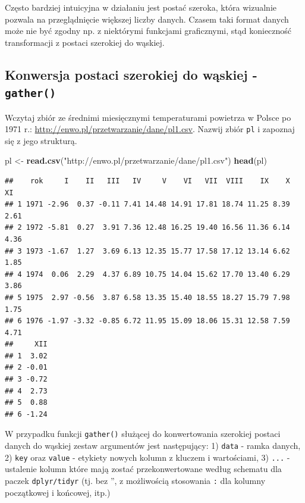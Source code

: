 \documentclass[]{book}
\newenvironment{Shaded}{\begin{snugshade}}{\end{snugshade}}
\newcommand{\KeywordTok}[1]{\textcolor[rgb]{0.13,0.29,0.53}{\textbf{#1}}}
\newcommand{\StringTok}[1]{\textcolor[rgb]{0.31,0.60,0.02}{#1}}
\newcommand{\NormalTok}[1]{#1}
\theoremstyle{definition}
\theoremstyle{definition}
\theoremstyle{definition}
\theoremstyle{remark}
\begin{document}
Często bardziej intuicyjna w działaniu jest postać szeroka, która
wizualnie pozwala na przeglądnięcie większej liczby danych. Czasem taki
format danych może nie być zgodny np. z niektórymi funkcjami
graficznymi, stąd konieczność transformacji z postaci szerokiej do
wąskiej.

\subsection*{\texorpdfstring{Konwersja postaci szerokiej do wąskiej -
\texttt{gather()}}{Konwersja postaci szerokiej do wąskiej - gather()}}\label{konwersja-postaci-szerokiej-do-waskiej---gather}

Wczytaj zbiór ze średnimi miesięcznymi temperaturami powietrza w Polsce
po 1971 r.: \url{http://enwo.pl/przetwarzanie/dane/pl1.csv}. Nazwij
zbiór \texttt{pl} i zapoznaj się z jego strukturą.

\begin{Shaded}
\begin{Highlighting}[]
\NormalTok{pl <-}\StringTok{ }\KeywordTok{read.csv}\NormalTok{(}\StringTok{"http://enwo.pl/przetwarzanie/dane/pl1.csv"}\NormalTok{)}
\KeywordTok{head}\NormalTok{(pl)}
\end{Highlighting}
\end{Shaded}

\begin{verbatim}
##    rok     I    II   III   IV     V    VI   VII  VIII    IX    X   XI
## 1 1971 -2.96  0.37 -0.11 7.41 14.48 14.91 17.81 18.74 11.25 8.39 2.61
## 2 1972 -5.81  0.27  3.91 7.36 12.48 16.25 19.40 16.56 11.36 6.14 4.36
## 3 1973 -1.67  1.27  3.69 6.13 12.35 15.77 17.58 17.12 13.14 6.62 1.85
## 4 1974  0.06  2.29  4.37 6.89 10.75 14.04 15.62 17.70 13.40 6.29 3.86
## 5 1975  2.97 -0.56  3.87 6.58 13.35 15.40 18.55 18.27 15.79 7.98 1.75
## 6 1976 -1.97 -3.32 -0.85 6.72 11.95 15.09 18.06 15.31 12.58 7.59 4.71
##     XII
## 1  3.02
## 2 -0.01
## 3 -0.72
## 4  2.73
## 5  0.88
## 6 -1.24
\end{verbatim}

W przypadku funkcji \texttt{gather()} służącej do konwertowania
szerokiej postaci danych do wąskiej zestaw argumentów jest następujący:
1) \texttt{data} - ramka danych, 2) \texttt{key} oraz \texttt{value} -
etykiety nowych kolumn z kluczem i wartościami, 3) \texttt{...} -
ustalenie kolumn które mają zostać przekonwertowane według schematu dla
paczek \texttt{dplyr/tidyr} (tj. bez '', z możliwością stosowania
\texttt{:} dla kolumny początkowej i końcowej, itp.)
\end{document}
